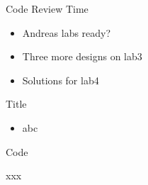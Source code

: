 \begin{frame}[fragile]{Code Review Time}
\begin{itemize}
\item Andreas labs ready?
\item Three more designs on lab3
\item Solutions for lab4
\end{itemize}
\end{frame}



\begin{frame}[fragile]{Title}
\begin{itemize}
\item abc
\end{itemize}
\end{frame}

\begin{frame}[fragile]{Code}
\begin{chisel}
xxx
\end{chisel}
\end{frame}
